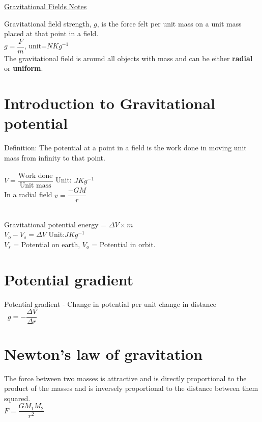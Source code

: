 \documentclass{article}[18pt]
\begin{document}
\begin{center}
\underline{\huge Gravitational Fields Notes}
\end{center}
Gravitational field strength, $g$, is the force felt per unit mass on a unit mass placed at that point in a field.\\
$g=\dfrac{F}{m}$, unit=$NKg^{-1}$\\
The gravitational field is around all objects with mass and can be either \textbf{radial} or \textbf{uniform}.
\section{Introduction to Gravitational potential}
Definition: The potential at a point in a field is the work done in moving unit mass from infinity to that point.\\
\\
$V=\dfrac{\text{Work done}}{\text{Unit mass}}$ Unit: $JKg^{-1}$\\
In a radial field $v=\dfrac{-GM}{r}$\\
\\
Gravitational potential energy = $\Delta V\times m$\\
$V_o-V_s=\Delta V$ Unit:$JKg^{-1}$\\
$V_s$ = Potential on earth, $V_o$ = Potential in orbit.
\section{Potential gradient}
Potential gradient - Change in potential per unit change in distance\\\
$g=-\dfrac{\Delta V}{\Delta r}$
\section{Newton's law of gravitation}
The force between two masses is attractive and is directly proportional to the product of the masses and is inversely proportional to the distance between them squared.\\
$F=\dfrac{GM_1M_2}{r^2}$
\end{document}
